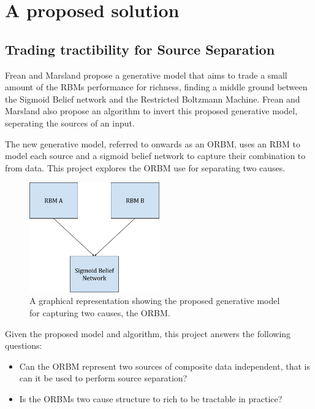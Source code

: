 \section{A proposed solution}
\subsection{Trading tractibility for Source Separation}
Frean and Marsland propose a generative model that aims to trade a small amount of the RBMs performance for richness, finding a middle ground between the Sigmoid Belief network and the Restricted Boltzmann Machine.
Frean and Marsland also propose an algorithm to invert this proposed generative model, seperating the sources of an input.

The new generative model, referred to onwards as an ORBM, uses an RBM to model each source and a sigmoid belief network to capture their combination to from data. This project explores the ORBM use for separating two causes.

\begin{figure}[h]
\begin{center}
  \includegraphics[width = 0.5\textwidth]{Assets/ORBM_fig_1}
\caption{A graphical representation showing the proposed generative model for capturing two causes, the ORBM.}

\label{F:ORBM-fig-1}
\end{center}
\end{figure}

Given the proposed model and algorithm, this project answers the following questions:
\begin{itemize}
  \item Can the ORBM represent two sources of composite data independent, that is can it be used to perform source separation?
  \item Is the ORBMs two cause structure to rich to be tractable in practice?
\end{itemize}

